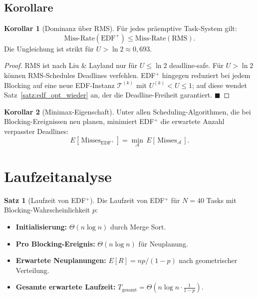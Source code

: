 ﻿\documentclass[a4paper,12pt]{report}
\theoremstyle{definition}
\newtheorem{satz}{Satz}[chapter]
\newtheorem{korollar}{Korollar}[chapter]
\begin{document}
\subsection{Korollare}

\begin{korollar}[Dominanz über RMS]
	Für jedes präemptive Task-System gilt:
	\[
		\text{Miss-Rate}(\text{EDF}^+) \leq \text{Miss-Rate}(\text{RMS}).
	\]
	Die Ungleichung ist strikt für $U > \ln 2 \approx 0{,}693$.
\end{korollar}

\begin{proof}
	RMS ist nach Liu \& Layland \cite{Liu1973} nur für $U \leq \ln 2$
	deadline-safe. Für $U > \ln 2$ können RMS-Schedules Deadlines verfehlen.
	EDF$^+$ hingegen reduziert bei jedem Blocking auf eine neue EDF-Instanz
	$\mathcal{T}^{(k)}$ mit $U^{(k)} < U \leq 1$; auf diese wendet
	Satz~\ref{satz:edf_opt_wieder} an, der die Deadline-Freiheit garantiert.
	\hfill$\blacksquare$
\end{proof}

\begin{korollar}[Minimax-Eigenschaft]
	Unter allen Scheduling-Algorithmen, die bei Blocking-Ereignissen neu planen,
	minimiert EDF$^+$ die erwartete Anzahl verpasster Deadlines:
	\[
		E[\,\text{Misses}_{\text{EDF}^+}\,] = \min_{\mathcal{A}} \,E[\,\text{Misses}_{\mathcal{A}}\,].
	\]
\end{korollar}

\section{Laufzeitanalyse}

\begin{satz}[Laufzeit von EDF$^+$]
	Die Laufzeit von EDF$^+$ für $N = 40$ Tasks mit Blocking-Wahrscheinlichkeit $p$:
	\begin{itemize}
		\item \textbf{Initialisierung:} $\Theta(n \log n)$ durch Merge Sort.
		\item \textbf{Pro Blocking-Ereignis:} $\Theta(n \log n)$ für Neuplanung.
		\item \textbf{Erwartete Neuplanungen:} $E[R] = np/(1-p)$ nach geometrischer Verteilung.
		\item \textbf{Gesamte erwartete Laufzeit:}
		      $T_{\text{gesamt}} = \Theta\!\left(n \log n \cdot \frac{1}{1-p}\right)$.
	\end{itemize}
\end{satz}
\end{document}
